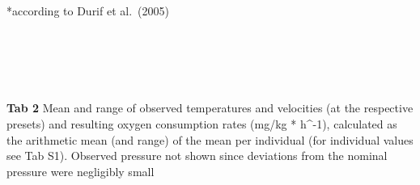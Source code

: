 \documentclass[
]{article}
\begin{document}
*according to Durif et al.~(2005)\\
\strut \\
\strut \\
\strut \\

\textbf{Tab 2} Mean and range of observed temperatures and velocities
(at the respective presets) and resulting oxygen consumption rates
(mg/kg * h\^{}-1), calculated as the arithmetic mean (and range) of the
mean per individual (for individual values see Tab S1). Observed
pressure not shown since deviations from the nominal pressure were
negligibly small

\providecommand{\docline}[3]{\noalign{\global\setlength{\arrayrulewidth}{#1}}\arrayrulecolor[HTML]{#2}\cline{#3}}

\setlength{\tabcolsep}{0pt}

\renewcommand*{\arraystretch}{1.5}
\end{document}
